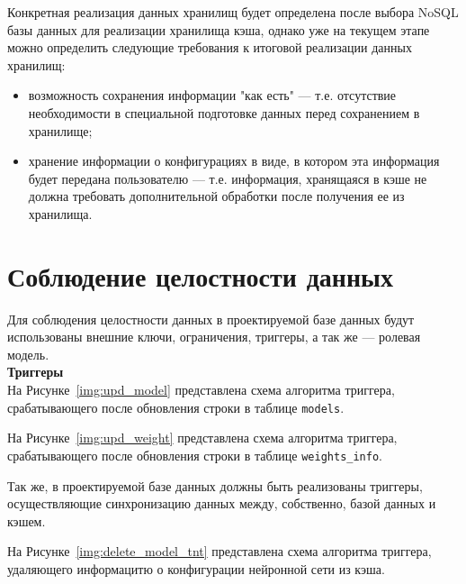 Конкретная реализация данных хранилищ будет определена после выбора NoSQL базы данных для реализации хранилища кэша, однако уже на текущем этапе можно определить следующие требования к итоговой реализации данных хранилищ:
\begin{itemize}
    \item возможность сохранения информации "как есть"{} --- т.е. отсутствие необходимости в специальной подготовке данных перед сохранением в хранилище;
    \item хранение информации о конфигурациях в виде, в котором эта информация будет передана пользователю --- т.е. информация, хранящаяся в кэше не должна требовать дополнительной обработки после получения ее из хранилища.
\end{itemize}

\section{Соблюдение целостности данных}

Для соблюдения целостности данных в проектируемой базе данных будут использованы внешние ключи, ограничения, триггеры, а так же --- ролевая модель.\\

\noindent\textbf{Триггеры}\\

На Рисунке~\ref{img:upd_model} представлена схема алгоритма триггера,  срабатывающего после обновления строки в таблице \texttt{models}.


На Рисунке~\ref{img:upd_weight} представлена схема алгоритма триггера,  срабатывающего после обновления строки в таблице \texttt{weights\_info}.


Так же, в проектируемой базе данных должны быть реализованы триггеры, осуществляющие синхронизацию данных между, собственно, базой данных и кэшем. 

На Рисунке~\ref{img:delete_model_tnt} представлена схема алгоритма триггера, удаляющего информацитю о конфигурации нейронной сети из кэша.


